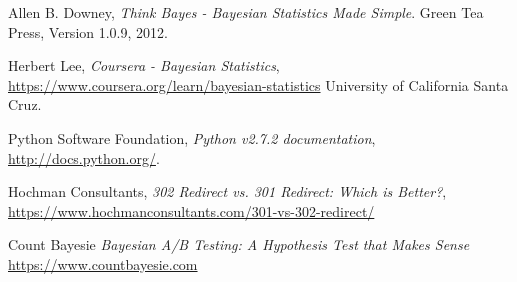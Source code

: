 \begin{thebibliography}{99}

  Allen B. Downey,
  \emph{Think Bayes - Bayesian Statistics Made Simple}.
  Green Tea Press,
  Version 1.0.9,
  2012.
  
  Herbert Lee,
  \emph{Coursera - Bayesian Statistics},
  \url{https://www.coursera.org/learn/bayesian-statistics}
  University of California Santa Cruz.

  Python Software Foundation,
  \emph{Python v2.7.2 documentation},
  \url{http://docs.python.org/}.

  Hochman Consultants,
  \emph{302 Redirect vs. 301 Redirect: Which is Better?},
  \url{https://www.hochmanconsultants.com/301-vs-302-redirect/}

  Count Bayesie
  \emph{Bayesian A/B Testing: A Hypothesis Test that Makes Sense} 
  \url{https://www.countbayesie.com}
\end{thebibliography}